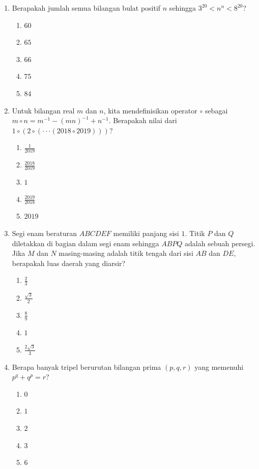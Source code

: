 \documentclass[12pt]{scrartcl}
\begin{document}
\begin{enumerate}
\item Berapakah jumlah semua bilangan bulat positif $n$ sehingga $3^{20}<n^{n}<8^{20}$?
\begin{enumerate}
    \item $60$
    \item $65$
    \item $66$
    \item $75$
    \item $84$
\end{enumerate}

\item Untuk bilangan real $m$ dan $n$, kita mendefinisikan operator $\circ$ sebagai $m\circ n = m^{-1}-(mn)^{-1}+n^{-1}$. Berapakah nilai dari $1\circ(2\circ(\cdot\cdot\cdot(2018\circ2019)))$?
\begin{enumerate}
    \item $\frac{1}{2019}$
    \item $\frac{2018}{2019}$
    \item $1$
    \item $\frac{2019}{2018}$
    \item $2019$
\end{enumerate}

\item Segi enam beraturan $ABCDEF$ memiliki panjang sisi $1$. Titik $P$ dan $Q$ diletakkan di bagian dalam segi enam sehingga $ABPQ$ adalah sebuah persegi. Jika $M$ dan $N$ masing-masing adalah titik tengah dari sisi $AB$ dan $DE$, berapakah luas daerah yang diarsir?
\begin{enumerate}
    \item $\frac{2}{3}$
    \item $\frac{\sqrt{3}}{2}$
    \item $\frac{8}{9}$
    \item $1$
    \item $\frac{2\sqrt{3}}{3}$
\end{enumerate}

\item Berapa banyak tripel berurutan bilangan prima $(p,q,r)$ yang memenuhi $p^{q}+q^{p}=r$?
\begin{enumerate}
    \item $0$
    \item $1$
    \item $2$
    \item $3$
    \item $6$
\end{enumerate}


\end{enumerate}
\end{document}
